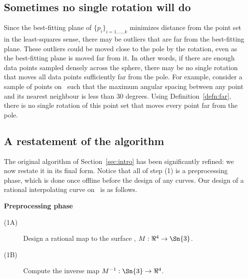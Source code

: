 %
%

\subsection{Sometimes no single rotation will do}
\label{sec:divandconq}

Since the best-fitting plane of $\{p_i\}_{i=1,\ldots,k}$ 
minimizes distance from the point set in the least-squares sense,
there may be outliers that are far from the best-fitting plane.
These outliers could be moved close to the pole by the rotation,
even as the best-fitting plane is moved far from it.
In other words,
if there are enough data points sampled densely across 
the sphere, there may be no single rotation that 
moves all data points sufficiently far from the pole.
For example, consider a sample of points on \ such that
the maximum angular spacing between any point and its nearest neighbour
is less than 30 degrees.
Using Definition~\ref{defn:far},
there is no single rotation of this point set that moves every point far
from the pole.

\subsection{A restatement of the algorithm}
\label{sec:restatement}

The original algorithm of Section~\ref{sec:intro} 
has been significantly refined: we now restate it in its final form.
Notice that all of step (1) is a preprocessing phase, 
which is done once offline before the design of any curves.
Our design of a rational interpolating curve on \ is as follows.

\vspace{.2in}

\centerline{{\bf Preprocessing phase}}
\begin{description}
\item[(1A)] Design a rational map to the surface , $M:\Re^4 \rightarrow \Sn{3}$.
\item[(1B)] Compute the inverse map $M^{-1}: \Sn{3} \rightarrow \Re^4$.
\end{description}

